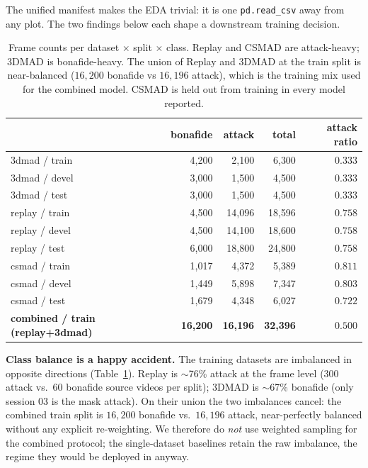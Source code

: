 \documentclass[anonymous, manuscript, screen, review]{acmart}
\begin{document}
The unified manifest makes the EDA trivial: it is one
\texttt{pd.read\_csv} away from any plot. The two findings below
each shape a downstream training decision.

\begin{table}[htbp]
\centering
\caption{Frame counts per dataset $\times$ split $\times$ class. Replay
and CSMAD are attack-heavy; 3DMAD is bonafide-heavy. The union of
Replay and 3DMAD at the train split is near-balanced ($16{,}200$
bonafide vs $16{,}196$ attack), which is the training mix used for
the combined model. CSMAD is held out from training in every model
reported.}
\label{tab:class-distribution}
\small
\begin{tabular}{l r r r r}
\toprule
                    & bonafide & attack & total  & attack ratio \\
\midrule
3dmad / train       & 4{,}200  & 2{,}100  & 6{,}300  & $0.333$ \\
3dmad / devel       & 3{,}000  & 1{,}500  & 4{,}500  & $0.333$ \\
3dmad / test        & 3{,}000  & 1{,}500  & 4{,}500  & $0.333$ \\
replay / train      & 4{,}500  & 14{,}096 & 18{,}596 & $0.758$ \\
replay / devel      & 4{,}500  & 14{,}100 & 18{,}600 & $0.758$ \\
replay / test       & 6{,}000  & 18{,}800 & 24{,}800 & $0.758$ \\
csmad  / train      & 1{,}017  & 4{,}372  & 5{,}389  & $0.811$ \\
csmad  / devel      & 1{,}449  & 5{,}898  & 7{,}347  & $0.803$ \\
csmad  / test       & 1{,}679  & 4{,}348  & 6{,}027  & $0.722$ \\
\midrule
\textbf{combined / train (replay+3dmad)} & \textbf{16{,}200} & \textbf{16{,}196} & \textbf{32{,}396} & \textbf{$0.500$} \\
\bottomrule
\end{tabular}
\end{table}

\textbf{Class balance is a happy accident.} The training datasets are
imbalanced in opposite directions (Table~\ref{tab:class-distribution}).
Replay is $\sim$76\% attack at the frame level (300 attack vs.\ 60
bonafide source videos per split); 3DMAD is $\sim$67\% bonafide (only
session 03 is the mask attack). On their union the two imbalances
cancel: the combined train split is $16{,}200$ bonafide vs.\ $16{,}196$
attack, near-perfectly balanced without any explicit re-weighting. We
therefore do \emph{not} use weighted sampling for the combined
protocol; the single-dataset baselines retain the raw imbalance, the
regime they would be deployed in anyway.
\end{document}
